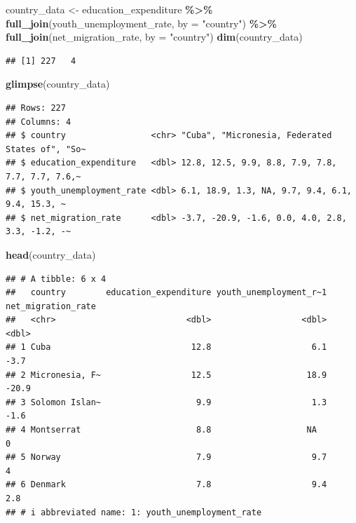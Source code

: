 \documentclass[
]{article}
\newenvironment{Shaded}{\begin{snugshade}}{\end{snugshade}}
\newcommand{\AttributeTok}[1]{\textcolor[rgb]{0.13,0.29,0.53}{#1}}
\newcommand{\FunctionTok}[1]{\textcolor[rgb]{0.13,0.29,0.53}{\textbf{#1}}}
\newcommand{\NormalTok}[1]{#1}
\newcommand{\OtherTok}[1]{\textcolor[rgb]{0.56,0.35,0.01}{#1}}
\newcommand{\SpecialCharTok}[1]{\textcolor[rgb]{0.81,0.36,0.00}{\textbf{#1}}}
\newcommand{\StringTok}[1]{\textcolor[rgb]{0.31,0.60,0.02}{#1}}
\begin{document}
\begin{Shaded}
\begin{Highlighting}[]
\NormalTok{country\_data }\OtherTok{\textless{}{-}}\NormalTok{ education\_expenditure }\SpecialCharTok{\%\textgreater{}\%}
  \FunctionTok{full\_join}\NormalTok{(youth\_unemployment\_rate, }\AttributeTok{by =} \StringTok{"country"}\NormalTok{) }\SpecialCharTok{\%\textgreater{}\%}
  \FunctionTok{full\_join}\NormalTok{(net\_migration\_rate, }\AttributeTok{by =} \StringTok{"country"}\NormalTok{)}
\FunctionTok{dim}\NormalTok{(country\_data)}
\end{Highlighting}
\end{Shaded}

\begin{verbatim}
## [1] 227   4
\end{verbatim}

\begin{Shaded}
\begin{Highlighting}[]
\FunctionTok{glimpse}\NormalTok{(country\_data)}
\end{Highlighting}
\end{Shaded}

\begin{verbatim}
## Rows: 227
## Columns: 4
## $ country                 <chr> "Cuba", "Micronesia, Federated States of", "So~
## $ education_expenditure   <dbl> 12.8, 12.5, 9.9, 8.8, 7.9, 7.8, 7.7, 7.7, 7.6,~
## $ youth_unemployment_rate <dbl> 6.1, 18.9, 1.3, NA, 9.7, 9.4, 6.1, 9.4, 15.3, ~
## $ net_migration_rate      <dbl> -3.7, -20.9, -1.6, 0.0, 4.0, 2.8, 3.3, -1.2, -~
\end{verbatim}

\begin{Shaded}
\begin{Highlighting}[]
\FunctionTok{head}\NormalTok{(country\_data)}
\end{Highlighting}
\end{Shaded}

\begin{verbatim}
## # A tibble: 6 x 4
##   country        education_expenditure youth_unemployment_r~1 net_migration_rate
##   <chr>                          <dbl>                  <dbl>              <dbl>
## 1 Cuba                            12.8                    6.1               -3.7
## 2 Micronesia, F~                  12.5                   18.9              -20.9
## 3 Solomon Islan~                   9.9                    1.3               -1.6
## 4 Montserrat                       8.8                   NA                  0  
## 5 Norway                           7.9                    9.7                4  
## 6 Denmark                          7.8                    9.4                2.8
## # i abbreviated name: 1: youth_unemployment_rate
\end{verbatim}
\end{document}
